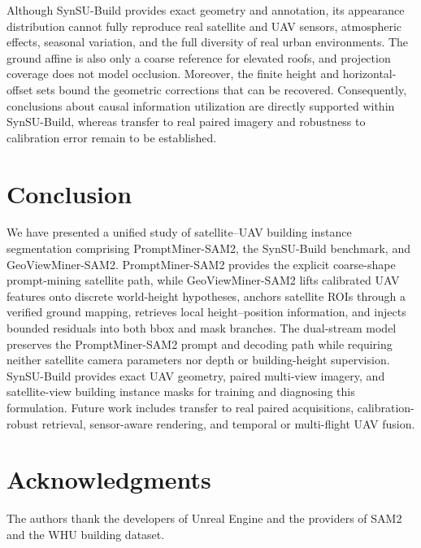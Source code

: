\documentclass[letterpaper,journal]{IEEEtran}
\begin{document}
Although SynSU-Build provides exact geometry and annotation, its appearance distribution cannot fully reproduce real satellite and UAV sensors, atmospheric effects, seasonal variation, and the full diversity of real urban environments. The ground affine is also only a coarse reference for elevated roofs, and projection coverage does not model occlusion. Moreover, the finite height and horizontal-offset sets bound the geometric corrections that can be recovered. Consequently, conclusions about causal information utilization are directly supported within SynSU-Build, whereas transfer to real paired imagery and robustness to calibration error remain to be established.

\section{Conclusion}
\label{sec:conclusion}
We have presented a unified study of satellite--UAV building instance segmentation comprising PromptMiner-SAM2, the SynSU-Build benchmark, and GeoViewMiner-SAM2. PromptMiner-SAM2 provides the explicit coarse-shape prompt-mining satellite path, while GeoViewMiner-SAM2 lifts calibrated UAV features onto discrete world-height hypotheses, anchors satellite ROIs through a verified ground mapping, retrieves local height--position information, and injects bounded residuals into both bbox and mask branches. The dual-stream model preserves the PromptMiner-SAM2 prompt and decoding path while requiring neither satellite camera parameters nor depth or building-height supervision. SynSU-Build provides exact UAV geometry, paired multi-view imagery, and satellite-view building instance masks for training and diagnosing this formulation. Future work includes transfer to real paired acquisitions, calibration-robust retrieval, sensor-aware rendering, and temporal or multi-flight UAV fusion.


\section*{Acknowledgments}
The authors thank the developers of Unreal Engine and the providers of SAM2 and the WHU building dataset.
\end{document}
